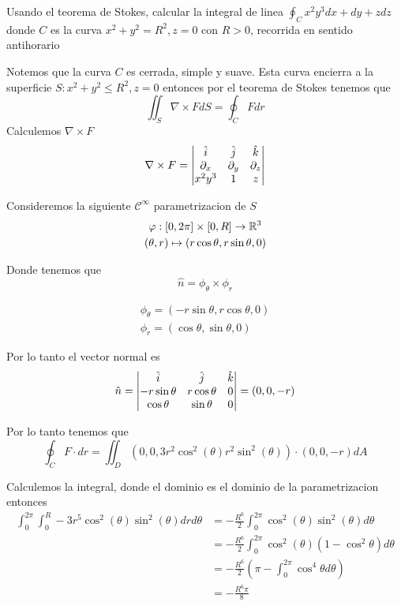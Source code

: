\documentclass[../main.tex]{subfiles}
\begin{document}
\begin{problem}
Usando el teorema de Stokes, calcular la integral de linea $\oint_{C} x^{2}y^{3} dx + dy + z dz$ donde $C$ es la curva $x^{2} + y^{2} = R^{2}, z = 0$ con $R > 0$, recorrida en sentido antihorario
\end{problem}
\begin{solution}
  Notemos que la curva $C$ es cerrada, simple y suave. Esta curva encierra a la superficie $S: x^{2} + y^{2} \leq R^{2}, z = 0$ entonces por el teorema de Stokes tenemos que
  \begin{equation*}
    \iint_{S} \nabla \times F dS = \oint_{C} F dr
  \end{equation*}
  Calculemos $\nabla \times F$
  \begin{equation*}
    \nabla \times F = \begin{vmatrix} \hat{i} & \hat{j} & \hat{k}\\ \partial_x & \partial_y & \partial_z\\ x^{2}y^{3} & 1 & z\end{vmatrix}
  \end{equation*}

  Consideremos la siguiente $\mathcal{C}^{\infty}$ parametrizacion de $S$
  \begin{gather*}
    \varphi : [0, 2\pi] \times [0, R] \to \mathbb{R}^{3}\\
    (\theta, r) \mapsto (r \cos \theta, r \sin \theta, 0)
  \end{gather*}

  Donde tenemos que
  \begin{equation*}
    \hat{n} = \phi_{\theta} \times \phi_{r}
  \end{equation*}

  \begin{gather*}
    \phi_{\theta} = (-r \sin \theta, r \cos \theta, 0)\\
    \phi_{r} = (\cos \theta, \sin \theta, 0)
  \end{gather*}

  Por lo tanto el vector normal es
  \begin{equation*}
    \hat{n} = \begin{vmatrix} \hat{i} & \hat{j} & \hat{k}\\ -r \sin \theta & r \cos \theta & 0\\ \cos \theta & \sin \theta & 0\end{vmatrix} = (0, 0, -r)
  \end{equation*}

  Por lo tanto tenemos que
  \begin{equation*}
    \oint_{C} F \cdot dr = \iint_{D} (0, 0, 3r^{2}\cos^{2}(\theta) r^{2} \sin^{2}(\theta)) \cdot (0, 0, -r) dA
  \end{equation*}

  Calculemos la integral, donde el dominio es el dominio de la parametrizacion entonces
  \begin{align*}
    \int_{0}^{2\pi}\int_{0}^{R} -3r^{5}\cos^{2}(\theta)\sin^{2}(\theta) drd\theta &= -\frac{R^{6}}{2} \int_{0}^{2\pi}\cos^{2}(\theta)\sin^{2}(\theta) d\theta\\
                                                                                  &= -\frac{R^{6}}{2} \int_{0}^{2\pi} \cos^{2}(\theta)(1 - \cos^{2} \theta) d\theta\\
                                                                                  &= -\frac{R^{6}}{2} (\pi - \int_{0}^{2\pi} \cos^{4} \theta d \theta)\\
    &= -\frac{R^{6}\pi}{8}
  \end{align*}
\end{solution}
\end{document}

